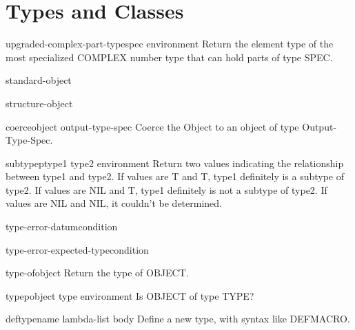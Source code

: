 \documentclass[10pt,english]{book}
\begin{document}
\section{Types and Classes}

\begin{function}{upgraded-complex-part-type}{spec \op environment}
  Return the element type of the most specialized COMPLEX number type that
   can hold parts of type SPEC.
\end{function}

\begin{class}{standard-object}{}
  
\end{class}

\begin{class}{structure-object}{}
  
\end{class}

\begin{function}{coerce}{object output-type-spec}
  Coerce the Object to an object of type Output-Type-Spec.
\end{function}

\begin{function}{subtypep}{type1 type2 \op environment}
  Return two values indicating the relationship between type1 and type2.
  If values are T and T, type1 definitely is a subtype of type2.
  If values are NIL and T, type1 definitely is not a subtype of type2.
  If values are NIL and NIL, it couldn't be determined.
\end{function}

\begin{function}{type-error-datum}{condition}
  
\end{function}

\begin{function}{type-error-expected-type}{condition}
  
\end{function}

\begin{function}{type-of}{object}
  Return the type of OBJECT.
\end{function}

\begin{function}{typep}{object type \op environment}
  Is OBJECT of type TYPE?
\end{function}

\begin{macro}{deftype}{name lambda-list \body body}
  Define a new type, with syntax like DEFMACRO.
\end{macro}
\end{document}
